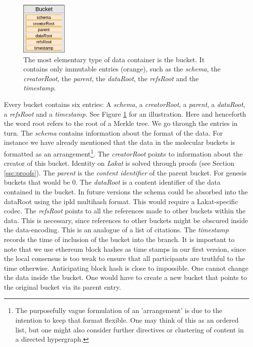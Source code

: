 \documentclass[14pt]{article}
\begin{document}
\begin{figure}[h!]
  \begin{center}
    \includegraphics[width=0.20\textwidth]{img/DataBucketV2.png}
\end{center}
 \caption{The most elementary type of data container is the bucket. It contains only immutable entries (orange), such as the \textit{schema}, the \textit{creatorRoot}, the \textit{parent}, the \textit{dataRoot}, the \textit{refsRoot} and the \textit{timestamp}.}
 \label{fig:bucket}
\end{figure}


Every bucket contains six entries: A \textit{schema}, a \textit{creatorRoot}, a \textit{parent}, a \textit{dataRoot}, a \textit{refsRoot} and a \textit{timestamp}. See Figure \ref{fig:bucket} for an illustration. Here and henceforth the word root refers to the root of a Merkle tree. We go through the entries in turn. The \textit{schema} contains information about the format of the data. For instance we have already mentioned that the data in the molecular buckets is formatted as an arrangement\footnote{The purposefully vague formulation of an 'arrangement' is due to the intention to keep that format flexible. One may think of this as an ordered list, but one might also consider further directives or clustering of content in a directed hypergraph.}. The \textit{creatorRoot} points to information about the creator of this bucket. Identity on \textit{Lakat} is solved through proofs (see Section \ref{ssc:proofs}). The \textit{parent} is the \textit{content identifier} of the parent bucket. For genesis buckets that would be 0. The \textit{dataRoot} is a content identifier of the data contained in the bucket. In future versions the schema could be absorbed into the dataRoot using the ipld multihash format. This would require a Lakat-specific codec. The \textit{refsRoot} points to all the references made to other buckets within the data. This is necessary, since references to other buckets might be obscured inside the data-encoding. This is an analogue of a list of citations. The \textit{timestamp} records the time of inclusion of the bucket into the branch. It is important to note that we use ethereum block hashes as time stamps in our first version, since the local consensus is too weak to ensure that all participants are truthful to the time otherwise. Anticipating block hash is close to impossible. One cannot change the data inside the bucket. One would have to create a new bucket that points to the original bucket via its parent entry. 
\end{document}
